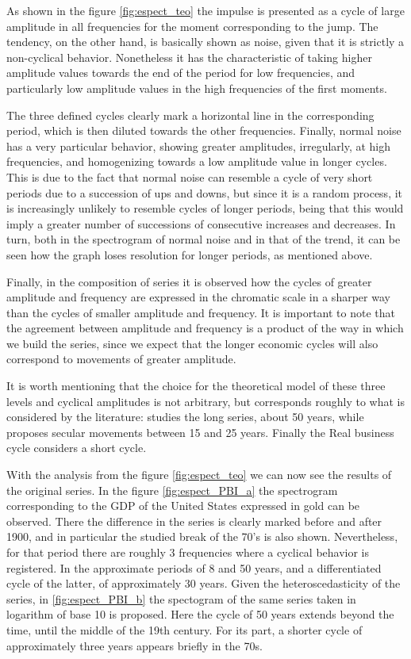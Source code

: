 \documentclass[a4paper]{article}
\begin{document}
As shown in the figure \ref{fig:espect_teo} the impulse is presented as a cycle of large amplitude in all frequencies for the moment corresponding to the jump. The tendency, on the other hand, is basically shown as noise, given that it is strictly a non-cyclical behavior. Nonetheless it has the characteristic of taking higher amplitude values towards the end of the period for low frequencies, and particularly low amplitude values in the high frequencies of the first moments.

The three defined cycles clearly mark a horizontal line in the corresponding period, which is then diluted towards the other frequencies. Finally, normal noise has a very particular behavior, showing greater amplitudes, irregularly, at high frequencies, and homogenizing towards a low amplitude value in longer cycles. This is due to the fact that normal noise can resemble a cycle of very short periods due to a succession of ups and downs, but since it is a random process, it is increasingly unlikely to resemble cycles of longer periods, being that this would imply a greater number of successions of consecutive increases and decreases. In turn, both in the spectrogram of normal noise and in that of the trend, it can be seen how the graph loses resolution for longer periods, as mentioned above.


Finally, in the composition of series it is observed how the cycles of greater amplitude and frequency are expressed in the chromatic scale in a sharper way than the cycles of smaller amplitude and frequency. It is important to note that the agreement between amplitude and frequency is a product of the way in which we build the series, since we expect that the longer economic cycles will also correspond to movements of greater amplitude.

It is worth mentioning that the choice for the theoretical model of these three levels and cyclical amplitudes is not arbitrary, but corresponds roughly to what is considered by the literature: \cite{kondratieff1979long} studies the long series, about 50 years, while \cite {kuznets1930secular} proposes secular movements between 15 and 25 years. Finally the Real business cycle \citep{kydland1982time} considers a short cycle.

With the analysis from the figure \ref{fig:espect_teo} we can now see the results of the original series. In the figure \ref{fig:espect_PBI_a} the spectrogram corresponding to the GDP of the United States expressed in gold can be observed. There the difference in the series is clearly marked before and after 1900, and in particular the studied break of the 70's is also shown. Nevertheless, for that period there are roughly 3 frequencies where a cyclical behavior is registered. In the approximate periods of 8 and 50 years, and a differentiated cycle of the latter, of approximately 30 years. Given the heteroscedasticity of the series, in \ref{fig:espect_PBI_b} the spectogram of the same series taken in logarithm of base 10 is proposed. Here the cycle of 50 years extends beyond the time, until the middle of the 19th century. For its part, a shorter cycle of approximately three years appears briefly in the 70s.
\end{document}
